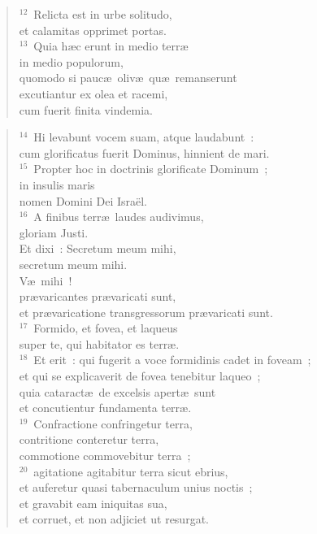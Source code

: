 \begin{verse}
${}^{12}$~Relicta est in urbe solitudo,\\ et calamitas opprimet portas.\\
${}^{13}$~Quia h\ae c erunt in medio terr\ae \\ in medio populorum,\\ quomodo si pauc\ae\ oliv\ae\ qu\ae\ remanserunt\\ excutiantur ex olea et racemi,\\ cum fuerit finita vindemia.\end{verse}


\begin{verse}${}^{14}$~Hi levabunt vocem suam, atque laudabunt~:\\ cum glorificatus fuerit Dominus, hinnient de mari.\\
${}^{15}$~Propter hoc in doctrinis glorificate Dominum~;\\ in insulis maris\\ nomen Domini Dei Isra\"el.\\
${}^{16}$~A finibus terr\ae\ laudes audivimus,\\ gloriam Justi.\\ Et dixi~: Secretum meum mihi,\\ secretum meum mihi.\\ V\ae\ mihi~!\\ pr\ae varicantes pr\ae varicati sunt,\\ et pr\ae varicatione transgressorum pr\ae varicati sunt.\\
${}^{17}$~Formido, et fovea, et laqueus\\ super te, qui habitator es terr\ae .\\
${}^{18}$~Et erit~: qui fugerit a voce formidinis cadet in foveam~;\\ et qui se explicaverit de fovea tenebitur laqueo~;\\ quia cataract\ae\ de excelsis apert\ae\ sunt\\ et concutientur fundamenta terr\ae .\\
${}^{19}$~Confractione confringetur terra,\\ contritione conteretur terra,\\ commotione commovebitur terra~;\\
${}^{20}$~agitatione agitabitur terra sicut ebrius,\\ et auferetur quasi tabernaculum unius noctis~;\\ et gravabit eam iniquitas sua,\\ et corruet, et non adjiciet ut resurgat.\\

\end{verse}
